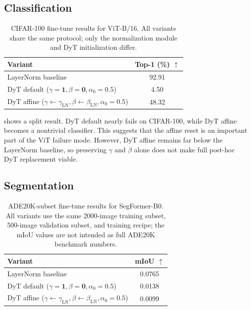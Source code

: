 \documentclass[10pt,twocolumn,letterpaper]{article}
\begin{document}
\subsection{Classification}
\label{subsec:cls_results}

\begin{table}[!htbp]
\centering
\small
\caption{CIFAR-100 fine-tune results for ViT-B/16. All variants share the same protocol; only the normalization module and DyT initialization differ.}
\label{tab:cls}
\begin{tabular}{lc}
\toprule
Variant & Top-1 (\%) $\uparrow$ \\
\midrule
LayerNorm baseline & 92.91 \\
DyT default ($\gamma{=}\mathbf{1}, \beta{=}\mathbf{0}, \alpha_0{=}0.5$) & 4.50 \\
DyT affine ($\gamma{\leftarrow}\gamma_\mathrm{LN}, \beta{\leftarrow}\beta_\mathrm{LN}, \alpha_0{=}0.5$) & 48.32 \\
\bottomrule
\end{tabular}
\end{table}

 shows a split result. DyT default nearly fails on CIFAR-100, while DyT affine becomes a nontrivial classifier. This suggests that the affine reset is an important part of the ViT failure mode. However, DyT affine remains far below the LayerNorm baseline, so preserving $\gamma$ and $\beta$ alone does not make full post-hoc DyT replacement viable.

\FloatBarrier
\subsection{Segmentation}
\label{subsec:seg_results}

\begin{table}[!htbp]
\centering
\small
\caption{ADE20K-subset fine-tune results for SegFormer-B0. All variants use the same 2000-image training subset, 500-image validation subset, and training recipe; the mIoU values are not intended as full ADE20K benchmark numbers.}
\label{tab:seg}
\begin{tabular}{lc}
\toprule
Variant & mIoU $\uparrow$ \\
\midrule
LayerNorm baseline & 0.0765 \\
DyT default ($\gamma{=}\mathbf{1}, \beta{=}\mathbf{0}, \alpha_0{=}0.5$) & 0.0138 \\
DyT affine ($\gamma{\leftarrow}\gamma_\mathrm{LN}, \beta{\leftarrow}\beta_\mathrm{LN}, \alpha_0{=}0.5$) & 0.0099 \\
\bottomrule
\end{tabular}
\end{table}
\end{document}
